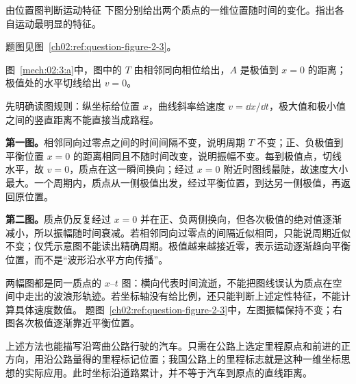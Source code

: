 {\begin{origexamplebox}{由位置图判断运动特征}\label{ch02:ex:k02-2-3}
下图分别给出两个质点的一维位置随时间的变化。指出各自运动最明显的特征。
\par 题图见图~\ref{ch02:ref:question-figure-2-3}。
\KQuestionAD
\end{origexamplebox}
\begin{xesolution}
\begin{qualityfigure}
\label{mech:02:3:a}
\end{qualityfigure}
图~\ref{mech:02:3:a}中，图中的 $T$ 由相邻同向相位给出，$A$ 是极值到 $x=0$ 的距离；极值处的水平切线给出 $v=0$。

先明确读图规则：纵坐标给位置 $x$，曲线斜率给速度 $v=\dd x/\dd t$，极大值和极小值之间的竖直距离不能直接当成路程。

\textbf{第一图。}相邻同向过零点之间的时间间隔不变，说明周期 $T$ 不变；正、负极值到平衡位置 $x=0$ 的距离相同且不随时间改变，说明振幅不变。每到极值点，切线水平，故 $v=0$，质点在这一瞬间换向；经过 $x=0$ 附近时图线最陡，故速度大小最大。一个周期内，质点从一侧极值出发，经过平衡位置，到达另一侧极值，再返回原位置。

\textbf{第二图。}质点仍反复经过 $x=0$ 并在正、负两侧换向，但各次极值的绝对值逐渐减小，所以振幅随时间衰减。若相邻同向过零点的间隔近似相同，只能说周期近似不变；仅凭示意图不能读出精确周期。极值越来越接近零，表示运动逐渐趋向平衡位置，而不是“波形沿水平方向传播”。

两幅图都是同一质点的 $x$--$t$ 图：横向代表时间流逝，不能把图线误认为质点在空间中走出的波浪形轨迹。若坐标轴没有给比例，还只能判断上述定性特征，不能计算具体速度数值。
题图~\ref{ch02:ref:question-figure-2-3}中，左图振幅保持不变；右图各次极值逐渐靠近平衡位置。
\end{xesolution}

上述方法也能描写沿弯曲公路行驶的汽车。只需在公路上选定里程原点和前进的正方向，用沿公路量得的里程标记位置；我国公路上的里程标志就是这种一维坐标思想的实际应用。此时坐标沿道路累计，并不等于汽车到原点的直线距离。

}
